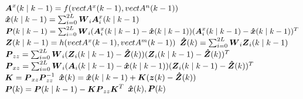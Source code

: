 \begin{algorithm}
\begin{algorithmic}
	\STATE   $\boldsymbol{A}^{x}(k \mid k-1) = f(vect{A}^{x}(k-1), vect{A}^{n}(k-1)) $
	\STATE	 $ \boldsymbol{\hat{x}}(k \mid k-1) = \sum_{i=0}^{2L} \boldsymbol{W}_{i} \boldsymbol{A}^{x}_{i}(k \mid k-1) $
	\STATE   $ \boldsymbol{P}(k \mid k-1) = \sum_{i=0}^{2L} \boldsymbol{W}_{i} (\boldsymbol{A}^{x}_{i}(k \mid k-1) - \boldsymbol{\hat{x}}(k \mid k-1)) 
																   (\boldsymbol{A}^{x}_{i}(k \mid k-1) - \boldsymbol{\hat{x}}(k \mid k-1))^{T} $
	\STATE   $\boldsymbol{Z}(k \mid k-1) = h(vect{A}^{x}(k-1), vect{A}^{m}(k-1)) $
	\STATE   $\boldsymbol{\hat{Z}}(k) =  \sum_{i=0}^{2L} \boldsymbol{W}_{i} \boldsymbol{Z}_{i}(k \mid k-1)$
	\STATE   $\boldsymbol{P}_{zz} =  \sum_{i=0}^{2L} \boldsymbol{W}_{i} (\boldsymbol{Z}_{i}(k \mid k-1)-\boldsymbol{\hat{Z}}(k)) 
															(\boldsymbol{Z}_{i}(k \mid k-1)-\boldsymbol{\hat{Z}}(k))^{T}$
	\STATE   $\boldsymbol{P}_{xz} =  \sum_{i=0}^{2L} \boldsymbol{W}_{i} (\boldsymbol{A}_{i}(k \mid k-1)-\boldsymbol{\hat{x}}(k \mid k-1))
															(\boldsymbol{Z}_{i}(k \mid k-1)-\boldsymbol{\hat{Z}}(k))^{T}$
	\STATE   $\boldsymbol{K}      = \boldsymbol{P}_{xz} \boldsymbol{P}_{zz}^{-1}$
	\STATE	 $ \boldsymbol{\hat{x}}(k) = \boldsymbol{\hat{x}}(k \mid k-1) + \boldsymbol{K} (\boldsymbol{z}(k) - \boldsymbol{\hat{Z}}(k))  $
	\STATE   $ \boldsymbol{P}(k) = \boldsymbol{P}(k \mid k-1) - \boldsymbol{K} \boldsymbol{P}_{zz} \boldsymbol{K}^{T} $
	\RETURN $\boldsymbol{\hat{x}}(k), \boldsymbol{P}(k)$
\ENDLOOP
\end{algorithmic}
\end{algorithm}

